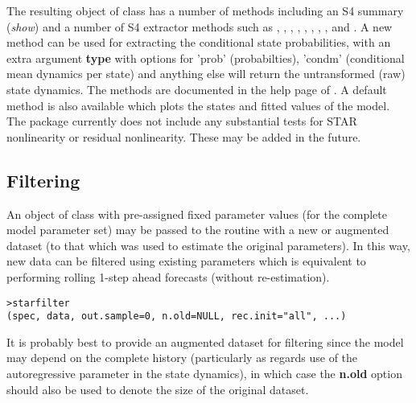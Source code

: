The resulting object of class  has a number of methods including
an S4 summary (\emph{show}) and a number of S4 extractor methods such as
, , , ,
, , , , 
and .
A new method  can be used for extracting the conditional state
probabilities, with an extra argument \textbf{type} with options for 'prob' 
(probabilties), 'condm' (conditional mean dynamics per state) and anything else 
will return the untransformed (raw) state dynamics. The methods are documented
in the help page of . A default  method is also
available which plots the states and fitted values of the model.
The package currently does not include any substantial tests for STAR
nonlinearity or residual nonlinearity. These may be added in the future.

\subsection{Filtering}
An object of class  with pre-assigned fixed parameter values
(for the complete model parameter set) may be passed to the 
routine with a new or augmented dataset (to that which was used to estimate the
original parameters). In this way, new data can be filtered using existing
parameters which is equivalent to performing rolling 1-step ahead forecasts
(without re-estimation).
\begin{lstlisting}
>starfilter
(spec, data, out.sample=0, n.old=NULL, rec.init="all", ...) 
\end{lstlisting}
It is probably best to provide an augmented dataset for filtering since the
model may depend on the complete history (particularly as regards use of the
autoregressive parameter in the state dynamics), in which case the
\textbf{n.old} option should also be used to denote the size of the original
dataset.

